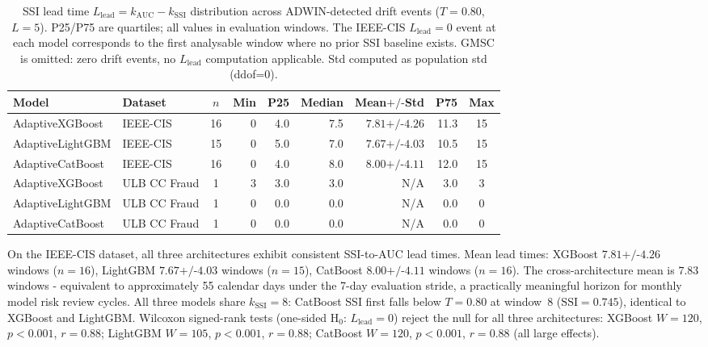 \documentclass[pdflatex,sn-mathphys-num]{sn-jnl}
\theoremstyle{thmstyleone}
\theoremstyle{thmstyletwo}
\theoremstyle{thmstylethree}
\begin{document}
\begin{table}[t]
  \caption{SSI lead time $L_{\mathrm{lead}} = k_{\mathrm{AUC}} - k_{\mathrm{SSI}}$
           distribution across ADWIN-detected drift events ($T=0.80$,
           $L=5$). P25/P75 are quartiles; all values in evaluation windows.
           The IEEE-CIS $L_{\mathrm{lead}}=0$ event at each model corresponds to the
           first analysable window where no prior SSI baseline exists.
           GMSC is omitted: zero drift events, no $L_{\mathrm{lead}}$ computation applicable.
           Std computed as population std (ddof=0).}
  \label{tab:lead_time}
  \centering\footnotesize
  \begin{tabular}{llcrrrrrc}
    \toprule
    Model & Dataset & $n$ & Min & P25 & Median & Mean$\text{+/-}$Std & P75 & Max \\
    \midrule
    AdaptiveXGBoost  & IEEE-CIS     & 16 & 0 & 4.0 & 7.5 & $7.81\text{+/-}4.26$ & 11.3 & 15 \\
    AdaptiveLightGBM & IEEE-CIS     & 15 & 0 & 5.0 & 7.0 & $7.67\text{+/-}4.03$ & 10.5 & 15 \\
    AdaptiveCatBoost & IEEE-CIS     & 16 & 0 & 4.0 & 8.0 & $8.00\text{+/-}4.11$ & 12.0 & 15 \\
    AdaptiveXGBoost  & ULB CC Fraud &  1 & 3 & 3.0 & 3.0 & N/A  &  3.0 &  3 \\
    AdaptiveLightGBM & ULB CC Fraud &  1 & 0 & 0.0 & 0.0 & N/A  &  0.0 &  0 \\
    AdaptiveCatBoost & ULB CC Fraud &  1 & 0 & 0.0 & 0.0 & N/A  &  0.0 &  0 \\
    \bottomrule
  \end{tabular}
\end{table}

On the IEEE-CIS dataset, all three architectures exhibit consistent
SSI-to-AUC lead times. Mean lead times: XGBoost $7.81 \text{+/-} 4.26$ windows
($n=16$), LightGBM $7.67 \text{+/-} 4.03$ windows ($n=15$), CatBoost
$8.00 \text{+/-} 4.11$ windows ($n=16$). The cross-architecture mean is
$7.83$ windows - equivalent to approximately 55 calendar days under the
7-day evaluation stride, a practically meaningful horizon for monthly model
risk review cycles. All three models share $k_{\mathrm{SSI}} = 8$: CatBoost
SSI first falls below $T = 0.80$ at window~8 ($\mathrm{SSI} = 0.745$),
identical to XGBoost and LightGBM. Wilcoxon signed-rank tests
(one-sided H$_0$: $L_{\mathrm{lead}} = 0$) reject the null for all three architectures:
XGBoost $W=120$, $p{<}0.001$, $r=0.88$; LightGBM $W=105$, $p{<}0.001$,
$r=0.88$; CatBoost $W=120$, $p{<}0.001$, $r=0.88$ (all large effects).
\end{document}
